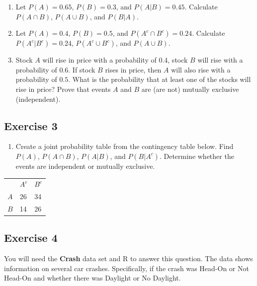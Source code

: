 \documentclass[
  letterpaper,
  DIV=11,
  numbers=noendperiod]{scrreprt}
\providecommand{\tightlist}{%
  \setlength{\itemsep}{0pt}\setlength{\parskip}{0pt}}\usepackage{longtable,booktabs,array}
\begin{document}
\begin{enumerate}
\def\labelenumi{\arabic{enumi}.}
\item
  Let \(P(A)=0.65\), \(P(B)=0.3\), and \(P(A|B)=0.45\). Calculate
  \(P(A \cap B)\), \(P(A \cup B)\), and \(P(B|A)\).
\item
  Let \(P(A)=0.4\), \(P(B)=0.5\), and \(P(A^c \cap B^c)=0.24\).
  Calculate \(P(A^c|B^c)=0.24\), \(P(A^c \cup B^c)\), and
  \(P(A \cup B)\).
\item
  Stock \(A\) will rise in price with a probability of \(0.4\), stock
  \(B\) will rise with a probability of \(0.6\). If stock \(B\) rises in
  price, then \(A\) will also rise with a probability of \(0.5\). What
  is the probability that at least one of the stocks will rise in price?
  Prove that events \(A\) and \(B\) are (are not) mutually exclusive
  (independent).
\end{enumerate}

\hypertarget{exercise-3-14}{%
\subsection*{Exercise 3}\label{exercise-3-14}}

\begin{enumerate}
\def\labelenumi{\arabic{enumi}.}
\tightlist
\item
  Create a joint probability table from the contingency table below.
  Find \(P(A)\), \(P(A \cap B)\), \(P(A|B)\), and \(P(B|A^c)\).
  Determine whether the events are independent or mutually exclusive.
\end{enumerate}

\begin{longtable}[]{@{}lll@{}}
\toprule()
\endhead
& \(A^c\) & \(B^c\) \\
\(A\) & 26 & 34 \\
\(B\) & 14 & 26 \\
\bottomrule()
\end{longtable}

\hypertarget{exercise-4-6}{%
\subsection*{Exercise 4}\label{exercise-4-6}}

You will need the \textbf{Crash} data set and R to answer this question.
The data shows information on several car crashes. Specifically, if the
crash was Head-On or Not Head-On and whether there was Daylight or No
Daylight.
\end{document}
